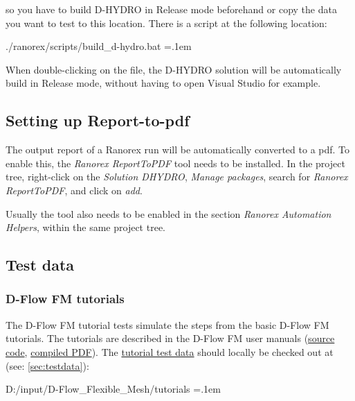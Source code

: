 \documentclass{article}
\newenvironment{lcverbatim}
 {\SaveVerbatim{cverb}}
 {\endSaveVerbatim
  \flushleft\fboxrule=0pt\fboxsep=.1em
  \colorbox{cverbbg}{%
    \makebox[\dimexpr\linewidth-2\fboxsep][l]{\BUseVerbatim{cverb}}%
  }
  \endflushleft
}
\begin{document}
so you have to build D-HYDRO in Release mode beforehand or copy the data you want to test to this location. There is a script at the following location:

\begin{lcverbatim}
./ranorex/scripts/build_d-hydro.bat
\end{lcverbatim}

When double-clicking on the file, the D-HYDRO solution will be automatically build in Release mode, without having to open Visual Studio for example.




\subsection{Setting up Report-to-pdf}
\label{sec:report_to_pdf}
The output report of a Ranorex run will be automatically converted to a pdf. To enable this, the \textit{Ranorex ReportToPDF} tool needs to be installed. In the project tree, right-click on the \textit{Solution DHYDRO}, \textit{Manage packages}, search for \textit{Ranorex ReportToPDF}, and click on \textit{add}.

Usually the tool also needs to be enabled in the section \textit{Ranorex Automation Helpers}, within the same project tree.





\subsection{Test data}
\subsubsection{D-Flow FM tutorials}\label{sec:fm_tutorials}
The D-Flow FM tutorial tests simulate the steps from the basic D-Flow FM tutorials. The tutorials are described in the D-Flow FM user manuals (\href{https://repos.deltares.nl/repos/ds/trunk/doc/user_manuals/dflowfm}{source code}, \href{https://dpcbuild.deltares.nl/buildConfiguration/DsDoc_ManualsValdationFunctionalityDocuments_ManualsLatexPdfRelease?}{compiled PDF}).
The \href{https://repos.deltares.nl/repos/ds/trunk/doc/user_manuals_tutorial_data/Tutorial_D-Flow_FM}{tutorial test data} should locally be checked out at (see: \ref{sec:testdata}):

\begin{lcverbatim}
D:/input/D-Flow_Flexible_Mesh/tutorials
\end{lcverbatim}
\end{document}
